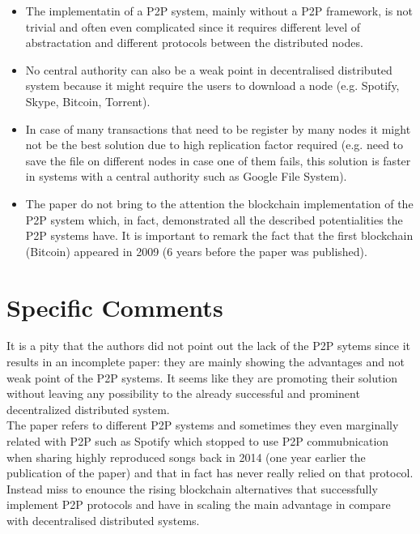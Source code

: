 \documentclass[paper=a4, fontsize=11pt]{scrartcl} %
\numberwithin{equation}{section} %
\numberwithin{figure}{section} %
\numberwithin{table}{section} %
\begin{document}
\begin{itemize}
  \item The implementatin of a P2P system, mainly without a P2P framework, is not trivial and often even complicated since it requires different level of abstractation and different protocols between the distributed nodes.
  \item No central authority can also be a weak point in decentralised distributed system because it might require the users to download a node (e.g. Spotify, Skype, Bitcoin, Torrent).
  \item In case of many transactions that need to be register by many nodes it might not be the best solution due to high replication factor required (e.g. need to save the file on different nodes in case one of them fails, this solution is faster in systems with a central authority such as Google File System).
  \item The paper do not bring to the attention the blockchain implementation of the P2P system which, in fact, demonstrated all the described potentialities the P2P systems have. It is important to remark the fact that the first blockchain (Bitcoin) appeared in 2009 (6 years before the paper was published).
\end{itemize}


\section{Specific Comments}

It is a pity that the authors did not point out the lack of the P2P sytems since it results in an incomplete paper: they are mainly showing the advantages and not weak point of the P2P systems. It seems like they are promoting their solution without leaving any possibility to the already successful and prominent decentralized distributed system. \\

The paper refers to different P2P systems and sometimes they even marginally related with P2P such as Spotify which stopped to use P2P commubnication when sharing highly reproduced songs back in 2014 (one year earlier the publication of the paper) and that in fact has never really relied on that protocol. \\

Instead miss to enounce the rising blockchain alternatives that successfully implement P2P protocols and have in scaling the main advantage in compare with decentralised distributed systems.
\end{document}
